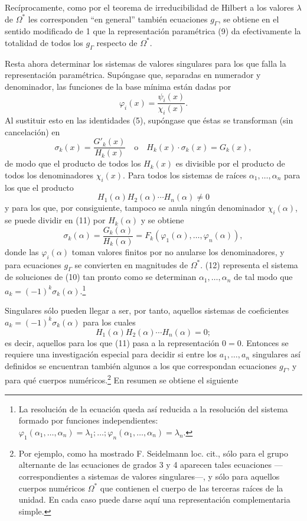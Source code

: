 Recíprocamente, como por el teorema de irreducibilidad de Hilbert a los valores $\lambda$ de $\Omega^*$ les corresponden ``en general'' también ecuaciones $g_\Gamma$, se obtiene en el sentido modificado de 1 que la representación paramétrica (9) da efectivamente la totalidad de todos los $g_\Gamma$ respecto de $\Omega^*$.

Resta ahora determinar los sistemas de valores singulares para los que falla la representación paramétrica. Supóngase que, separadas en numerador y denominador, las funciones de la base mínima están dadas por
\[
\varphi_i(x)=\frac{\psi_i(x)}{\chi_i(x)}.
\]
Al sustituir esto en las identidades (5), supóngase que éstas se transforman (sin cancelación) en
\begin{equation}\tag{11}
\sigma_k(x)=\frac{G'_k(x)}{H_k(x)}\quad\text{o}\quad H_k(x)\cdot\sigma_k(x)=G_k(x),
\end{equation}
de modo que el producto de todos los $H_k(x)$ es divisible por el producto de todos los denominadores $\chi_i(x)$. Para todos los sistemas de raíces $\alpha_1,
\ldots,\alpha_n$ para los que el producto
\[
H_1(\alpha)H_2(\alpha)\cdots H_n(\alpha)\ne0
\]
y para los que, por consiguiente, tampoco se anula ningún denominador $\chi_i(\alpha)$, se puede dividir en (11) por $H_k(\alpha)$ y se obtiene
\begin{equation}\tag{12}
\sigma_k(\alpha)=\frac{G_k(\alpha)}{H_k(\alpha)}=F_k(\varphi_1(\alpha),\ldots,\varphi_n(\alpha)),
\end{equation}
donde las $\varphi_i(\alpha)$ toman valores finitos por no anularse los denominadores, y para ecuaciones $g_\Gamma$ se convierten en magnitudes de $\Omega^*$. (12) representa el sistema de soluciones de (10) tan pronto como se determinan $\alpha_1,
\ldots,\alpha_n$ de tal modo que $a_k=(-1)^k\sigma_k(\alpha)$.\footnote{La resolución de la ecuación queda así reducida a la resolución del sistema formado por funciones independientes:
$\varphi_1(\alpha_1,
\ldots,\alpha_n)=\lambda_1;\ldots;\varphi_n(\alpha_1,
\ldots,\alpha_n)=\lambda_n$.}

Singulares sólo pueden llegar a ser, por tanto, aquellos sistemas de coeficientes $a_k=(-1)^k\sigma_k(\alpha)$ para los cuales
\[
H_1(\alpha)H_2(\alpha)\cdots H_n(\alpha)=0;
\]
es decir, aquellos para los que (11) pasa a la representación $0=0$. Entonces se requiere una investigación especial para decidir si entre los $a_1,
\ldots,a_n$ singulares así definidos se encuentran también algunos a los que correspondan ecuaciones $g_\Gamma$, y para qué cuerpos numéricos.\footnote{Por ejemplo, como ha mostrado F. Seidelmann loc. cit., sólo para el grupo alternante de las ecuaciones de grados 3 y 4 aparecen tales ecuaciones ---correspondientes a sistemas de valores singulares---, y sólo para aquellos cuerpos numéricos $\Omega^*$ que contienen el cuerpo de las terceras raíces de la unidad. En cada caso puede darse aquí una representación complementaria simple.} En resumen se obtiene el siguiente


